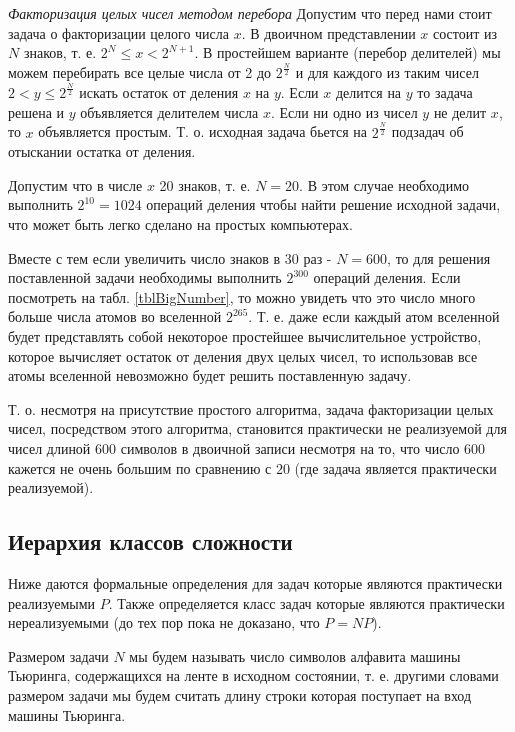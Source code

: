 \begin{example}
\emph{Факторизация целых чисел методом перебора}
\label{exAddAlgoTrialDivision}
Допустим что перед нами стоит задача о факторизации целого числа $x$. В
двоичном представлении $x$ состоит из $N$ знаков, т. е. 
$2^N \le x < 2^{N+1}$. В простейшем варианте (перебор делителей) мы
можем перебирать все целые числа от 2 до $2^{\frac{N}{2}}$ и для
каждого из таким чисел $2 < y \le 2^{\frac{N}{2}}$ искать остаток от
деления $x$ на $y$. Если $x$ делится на $y$ то задача решена и $y$
объявляется делителем числа $x$. Если ни одно из чисел $y$ не делит
$x$, то $x$ объявляется простым.
Т. о. исходная задача бьется на $2^{\frac{N}{2}}$ подзадач об отыскании
остатка от деления.

Допустим что в числе $x$ 20 знаков, т. е. $N=20$. В этом случае
необходимо выполнить $2^{10} = 1024$ операций деления чтобы найти
решение исходной задачи, что может быть легко сделано на простых
компьютерах. 

Вместе с тем если увеличить число знаков в 30 раз - $N=600$, то для
решения поставленной задачи необходимы выполнить $2^{300}$ операций
деления. Если посмотреть на табл. \ref{tblBigNumber}, то можно увидеть
что это число много больше числа атомов во вселенной
$2^{265}$. Т. е. даже если каждый атом вселенной будет представлять
собой некоторое простейшее вычислительное устройство, которое
вычисляет остаток от деления двух целых чисел, то использовав все
атомы вселенной невозможно будет решить поставленную задачу. 

Т. о. несмотря на присутствие простого алгоритма, задача факторизации
целых чисел, посредством этого алгоритма, становится практически
не реализуемой для чисел длиной $600$ символов в двоичной записи
несмотря на то, что число $600$ кажется не очень большим по сравнению
с $20$ (где задача является практически реализуемой).
\end{example}


\subsection{Иерархия классов сложности}

Ниже даются формальные определения для задач которые являются
практически реализуемыми $P$. Также определяется класс задач которые
являются практически нереализуемыми (до тех пор пока не доказано, что
$P = NP$).

\begin{definition}
Размером задачи $N$ мы будем называть число символов алфавита машины
Тьюринга, содержащихся на ленте в исходном состоянии, т. е. другими
словами размером задачи мы будем считать длину строки которая
поступает на вход машины Тьюринга.
\end{definition}

